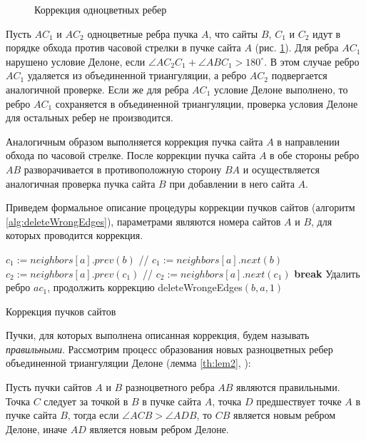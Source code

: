 \documentclass[12pt]{article}
\newcommand{\Break}{\State \textbf{break} }
\begin{document}
\begin{figure}[htb!]
	\caption{Коррекция одноцветных ребер}
	\label{pic:deleteWrongEdges}
\end{figure}

Пусть $AC_1$ и $AC_2$ одноцветные ребра пучка $A$,
что сайты $B$, $C_1$ и $C_2$ идут в порядке обхода против часовой стрелки в пучке сайта $A$ (рис. \ref{pic:deleteWrongEdges}).
Для ребра $AC_1$ нарушено условие Делоне, если $\angle AC_2C_1 + \angle ABC_1 > 180^\circ$.
В этом случае ребро $AC_1$ удаляется из объединенной триангуляции, а ребро $AC_2$ подвергается аналогичной проверке.
Если же для ребра $AC_1$ условие Делоне выполнено, то ребро $AC_1$ сохраняется в объединенной триангуляции,
проверка условия Делоне для остальных ребер не производится.

Аналогичным образом выполняется коррекция пучка сайта $A$
в направлении обхода по часовой стрелке.
После коррекции пучка сайта $A$ в обе стороны
ребро $AB$ разворачивается в противоположную сторону $BA$ и
осуществляется аналогичная проверка пучка сайта $B$ при добавлении в него сайта $A$.

Приведем формальное описание процедуры коррекции пучков сайтов (алгоритм \ref{alg:deleteWrongEdges}),
параметрами являются номера сайтов $A$ и $B$, для которых проводится коррекция.

\begin{algorithm}[htb!]
\begin{algorithmic}[1]
		\State $c_1 := neighbors[a].prev(b)$ // $c_1 := neighbors[a].next(b)$
		\State $c_2 := neighbors[a].prev(c_1)$ // $c_2 := neighbors[a].next(c_1)$
			\Break
		\Else
			\State Удалить ребро $ac_1$, продолжить коррекцию
		\EndIf
	\EndWhile
		\State deleteWrongeEdges$(b, a, 1)$
	\EndIf
\EndProcedure
\end{algorithmic}
\caption{Коррекция пучков сайтов}
\label{alg:deleteWrongEdges}
\end{algorithm}

Пучки, для которых выполнена описанная коррекция, будем называть {\itshape правильными}.
Рассмотрим процесс образования новых разноцветных ребер объединенной триангуляции Делоне (лемма \ref{th:lem2}, \cite{MestOverlap}):

\begin{lemma}
\label{th:lem2}
Пусть пучки сайтов $A$ и $B$ разноцветного ребра $AB$ являются правильными.
Точка $C$ следует за точкой в $B$ в пучке сайта $A$, точка $D$ предшествует точке $A$ в пучке сайта $B$,
тогда если $\angle ACB > \angle ADB$, то $CB$ является новым ребром Делоне, иначе $AD$ является новым ребром Делоне.
\end{lemma}
\end{document}
